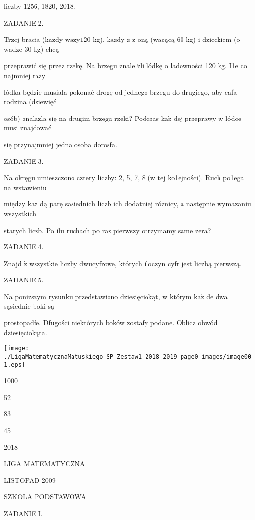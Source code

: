 \documentclass[a4paper,12pt]{article}
\begin{document}
liczby 1256, 1820, 2018.

ZADANIE 2.

Trzej bracia (kazdy $\mathrm{w}\mathrm{a}\dot{\mathrm{z}}\mathrm{y}120$ kg), $\mathrm{k}\mathrm{a}\dot{\mathrm{z}}\mathrm{d}\mathrm{y}$ z $\dot{\mathrm{z}}$ oną (wazącą 60 kg) i dzieckiem (o wadze 30 kg) chcą

przeprawić się przez rzekę. Na brzegu znale $\acute{\mathrm{z}}\mathrm{l}\mathrm{i}$ lódkę o ladowności 120 kg. I1e co najmniej razy

lódka będzie musiala pokonać drogę od jednego brzegu do drugiego, aby cafa rodzina (dziewięć

osób) znalazla się na drugim brzegu rzeki? Podczas $\mathrm{k}\mathrm{a}\dot{\mathrm{z}}$ dej przeprawy w lódce musi znajdować

się przynajmniej jedna osoba dorosfa.

ZADANIE 3.

Na okręgu umieszczono cztery liczby: 2, 5, 7, 8 (w tej ko1ejności). Ruch po1ega na wstawieniu

między $\mathrm{k}\mathrm{a}\dot{\mathrm{z}}$ dą parę sasiednich liczb ich dodatniej róznicy, a następnie wymazaniu wszystkich

starych liczb. Po ilu ruchach po raz pierwszy otrzymamy same zera?

ZADANIE 4.

Znajd $\acute{\mathrm{z}}$ wszystkie liczby dwucyfrowe, których iloczyn cyfr jest liczbą pierwszą.

ZADANIE 5.

Na ponizszym rysunku przedstawiono dziesięciokąt, w którym $\mathrm{k}\mathrm{a}\dot{\mathrm{z}}$ de dwa sąsiednie boki są

prostopadfe. Dfugości niektórych boków zostafy podane. Oblicz obwód dziesięciokąta.
\begin{center}
\texttt{[image: ./LigaMatematycznaMatuskiego\_SP\_Zestaw1\_2018\_2019\_page0\_images/image001.eps]}
\end{center}
1000

52

83

45

2018






LIGA MATEMATYCZNA

LISTOPAD 2009

SZKOLA PODSTAWOWA

ZADANIE I.
\end{document}
